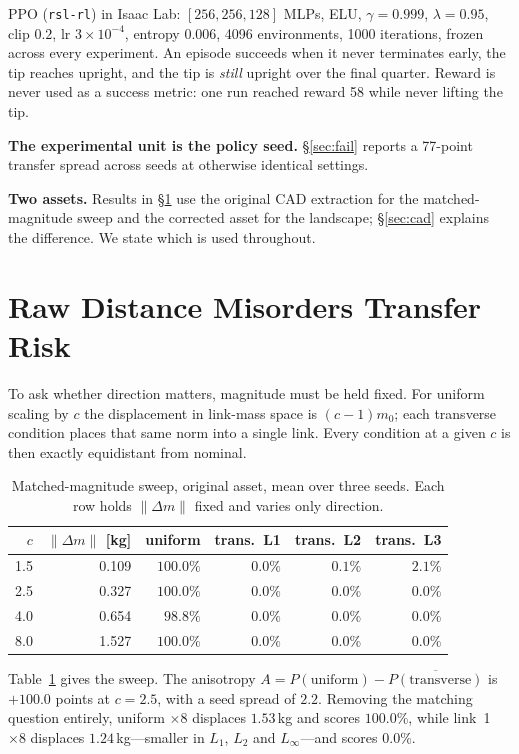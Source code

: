 \documentclass[conference]{IEEEtran}
\begin{document}
PPO (\texttt{rsl-rl}) in Isaac Lab: $[256,256,128]$ MLPs, ELU, $\gamma=0.999$,
$\lambda=0.95$, clip $0.2$, lr $3\!\times\!10^{-4}$, entropy $0.006$, 4096
environments, 1000 iterations, frozen across every experiment. An episode
succeeds when it never terminates early, the tip reaches upright, and the tip
is \emph{still} upright over the final quarter. Reward is never used as a
success metric: one run reached reward 58 while never lifting the tip.

\textbf{The experimental unit is the policy seed.} \S\ref{sec:fail} reports a
77-point transfer spread across seeds at otherwise identical settings.

\textbf{Two assets.} Results in \S\ref{sec:aniso} use the original CAD
extraction for the matched-magnitude sweep and the corrected asset for the
landscape; \S\ref{sec:cad} explains the difference. We state which is used
throughout.

\section{Raw Distance Misorders Transfer Risk}\label{sec:aniso}

To ask whether direction matters, magnitude must be held fixed. For uniform
scaling by $c$ the displacement in link-mass space is $(c-1)m_0$; each
transverse condition places that same norm into a single link. Every condition
at a given $c$ is then exactly equidistant from nominal.

\begin{table}[t]
\caption{Matched-magnitude sweep, original asset, mean over three seeds. Each
row holds $\|\Delta m\|$ fixed and varies only direction.}
\label{tab:matched}
\centering
\begin{tabular}{rrrrrr}
\toprule
$c$ & $\|\Delta m\|$ [kg] & uniform & trans.\ L1 & trans.\ L2 & trans.\ L3\\
\midrule
1.5 & 0.109 & $100.0\%$ & $0.0\%$ & $0.1\%$ & $2.1\%$\\
2.5 & 0.327 & $100.0\%$ & $0.0\%$ & $0.0\%$ & $0.0\%$\\
4.0 & 0.654 & $98.8\%$  & $0.0\%$ & $0.0\%$ & $0.0\%$\\
8.0 & 1.527 & $100.0\%$ & $0.0\%$ & $0.0\%$ & $0.0\%$\\
\bottomrule
\end{tabular}
\end{table}

Table~\ref{tab:matched} gives the sweep. The anisotropy
$A = P(\text{uniform}) - \overline{P(\text{transverse})}$ is $+100.0$ points at
$c=2.5$, with a seed spread of $2.2$. Removing the matching question entirely,
uniform $\times 8$ displaces $1.53\,$kg and scores $100.0\%$, while link~1
$\times 8$ displaces $1.24\,$kg---smaller in $L_1$, $L_2$ and $L_\infty$---and
scores $0.0\%$.
\end{document}

